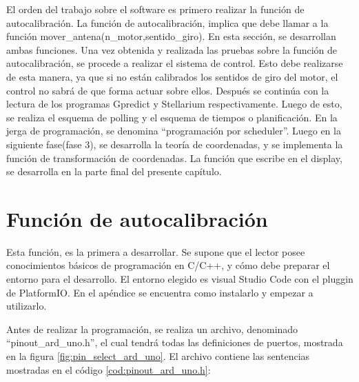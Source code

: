 El orden del trabajo sobre el software es primero realizar la función de autocalibración. La función de autocalibración, implica que debe llamar a la función mover\_antena(n\_motor,sentido\_giro). En esta sección, se desarrollan ambas funciones. Una vez obtenida y realizada las pruebas sobre la función de autocalibración, se procede a realizar el sistema de control. Esto debe realizarse de esta manera, ya que si no están calibrados los sentidos de giro del motor, el control no sabrá de que forma actuar sobre ellos. Después se continúa con la lectura de los programas Gpredict y Stellarium respectivamente. Luego de esto, se realiza el esquema de polling y el esquema de tiempos o planificación. En la jerga de programación, se denomina ``programación por scheduler''. Luego en la siguiente fase(fase 3), se desarrolla la teoría de coordenadas, y se implementa la función de transformación de coordenadas. La función que escribe en el display, se desarrolla en la parte final del presente capítulo. 








%
\section{Función de autocalibración}
Esta función, es la primera a desarrollar. Se supone que el lector posee conocimientos básicos de programación en C/C++, y cómo debe preparar el entorno para el desarrollo. El entorno elegido es visual Studio Code con el pluggin de PlatformIO. En el apéndice se encuentra como instalarlo y empezar a utilizarlo. 

Antes de realizar la programación, se realiza un archivo, denominado ``pinout\_ard\_uno.h'', el cual tendrá todas las definiciones de puertos, mostrada en la figura \ref{fig:pin_select_ard_uno}. El archivo contiene las sentencias mostradas en el código \ref{cod:pinout_ard_uno.h}: 


